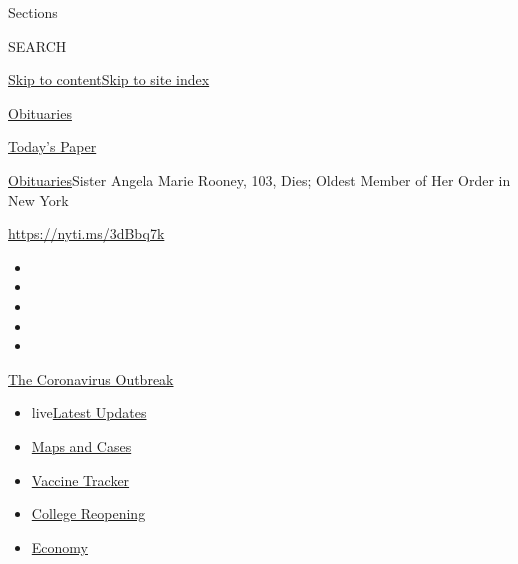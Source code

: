 Sections

SEARCH

\protect\hyperlink{site-content}{Skip to
content}\protect\hyperlink{site-index}{Skip to site index}

\href{https://www.nytimes.com/section/obituaries}{Obituaries}

\href{https://myaccount.nytimes.com/auth/login?response_type=cookie\&client_id=vi}{}

\href{https://www.nytimes.com/section/todayspaper}{Today's Paper}

\href{/section/obituaries}{Obituaries}\textbar{}Sister Angela Marie
Rooney, 103, Dies; Oldest Member of Her Order in New York

\url{https://nyti.ms/3dBbq7k}

\begin{itemize}
\item
\item
\item
\item
\item
\end{itemize}

\href{https://www.nytimes.com/news-event/coronavirus?action=click\&pgtype=Article\&state=default\&region=TOP_BANNER\&context=storylines_menu}{The
Coronavirus Outbreak}

\begin{itemize}
\tightlist
\item
  live\href{https://www.nytimes.com/2020/08/03/world/coronavirus-covid-19.html?action=click\&pgtype=Article\&state=default\&region=TOP_BANNER\&context=storylines_menu}{Latest
  Updates}
\item
  \href{https://www.nytimes.com/interactive/2020/us/coronavirus-us-cases.html?action=click\&pgtype=Article\&state=default\&region=TOP_BANNER\&context=storylines_menu}{Maps
  and Cases}
\item
  \href{https://www.nytimes.com/interactive/2020/science/coronavirus-vaccine-tracker.html?action=click\&pgtype=Article\&state=default\&region=TOP_BANNER\&context=storylines_menu}{Vaccine
  Tracker}
\item
  \href{https://www.nytimes.com/2020/08/02/us/covid-college-reopening.html?action=click\&pgtype=Article\&state=default\&region=TOP_BANNER\&context=storylines_menu}{College
  Reopening}
\item
  \href{https://www.nytimes.com/live/2020/08/03/business/stock-market-today-coronavirus?action=click\&pgtype=Article\&state=default\&region=TOP_BANNER\&context=storylines_menu}{Economy}
\end{itemize}

